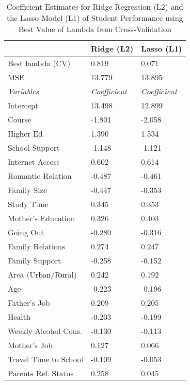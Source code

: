\documentclass[sigconf]{acmart}
\begin{document}
\begin{table}
  \caption{Coefficient Estimates for Ridge Regression (L2) and the Lasso Model
  (L1) of Student Performance using Best Value of Lambda from Cross-Validation}
  \label{tab:freq}
  \begin{tabular}{lll}
    \toprule    
                        &   Ridge (L2)  & Lasso (L1) \\
    \midrule
    Best lambda (CV)    &    0.819      &  0.071    \\
    MSE                 &   13.779      & 13.895    \\
    \midrule
    \textit{Variables}  & \textit{Coefficient} &  \textit{Coefficient} \\
    \midrule
    Intercept           &   13.498      &   12.899   \\
    Course              &   -1.801      &   -2.058   \\
    Higher Ed           &    1.390      &    1.534   \\
    School Support      &   -1.148      &   -1.121   \\
    Internet Access     &    0.602      &    0.614   \\
    Romantic Relation   &   -0.487      &   -0.461   \\    
    Family Size         &   -0.447      &   -0.353   \\   
    Study Time          &    0.345      &    0.353   \\   
    Mother's Education  &    0.326      &    0.403   \\    
    Going Out           &   -0.280      &   -0.316   \\
    Family Relations    &    0.274      &    0.247   \\
    Family Support      &   -0.258      &   -0.152   \\ 
    Area (Urban/Rural)  &    0.242      &    0.192   \\
    Age                 &   -0.223      &   -0.196   \\ 
    Father's Job        &    0.209      &    0.205   \\
    Health              &   -0.203      &   -0.199   \\
    Weekly Alcohol Cons.&   -0.130      &   -0.113   \\
    Mother's Job        &    0.127      &    0.066   \\
    Travel Time to School & -0.109      &   -0.053   \\
    Parents Rel. Status &    0.258      &    0.045   \\   

\end{tabular}
\end{table}
\end{document}
